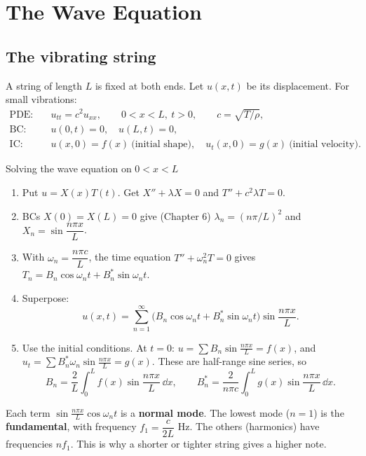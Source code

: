 \chapter{The Wave Equation}

\section{The vibrating string}

A string of length $L$ is fixed at both ends. Let $u(x,t)$ be its displacement. For small vibrations:
\begin{align*}
\text{PDE:}\quad & u_{tt} = c^2u_{xx}, \qquad 0<x<L,\ t>0,\qquad c = \sqrt{T/\rho},\\
\text{BC:}\quad & u(0,t) = 0,\quad u(L,t)=0,\\
\text{IC:}\quad & u(x,0) = f(x)\ \text{(initial shape)},\quad u_t(x,0) = g(x)\ \text{(initial velocity)}.
\end{align*}

\begin{methodbox}{Solving the wave equation on $0<x<L$}
\begin{enumerate}
  \item Put $u=X(x)T(t)$. Get $X''+\lambda X=0$ and $T'' + c^2\lambda T = 0$.
  \item BCs $X(0)=X(L)=0$ give (Chapter 6) $\lambda_n = (n\pi/L)^2$ and $X_n = \sin\dfrac{n\pi x}{L}$.
  \item With $\omega_n = \dfrac{n\pi c}{L}$, the time equation $T''+\omega_n^2T=0$ gives $T_n = B_n\cos\omega_nt + B_n^*\sin\omega_nt$.
  \item Superpose:
  \[ u(x,t) = \sum_{n=1}^{\infty}\big(B_n\cos\omega_nt + B_n^*\sin\omega_nt\big)\sin\frac{n\pi x}{L}. \]
  \item Use the initial conditions. At $t=0$: $u = \sum B_n\sin\frac{n\pi x}{L} = f(x)$, and $u_t = \sum B_n^*\omega_n\sin\frac{n\pi x}{L} = g(x)$. These are half-range sine series, so
  \[ B_n = \frac2L\int_0^L f(x)\sin\frac{n\pi x}{L}\,\dd x, \qquad B_n^* = \frac{2}{n\pi c}\int_0^L g(x)\sin\frac{n\pi x}{L}\,\dd x. \]
\end{enumerate}
\end{methodbox}

Each term $\sin\frac{n\pi x}{L}\cos\omega_nt$ is a \textbf{normal mode}. The lowest mode ($n=1$) is the \textbf{fundamental}, with frequency $f_1 = \dfrac{c}{2L}$ Hz. The others (harmonics) have frequencies $nf_1$. This is why a shorter or tighter string gives a higher note.

